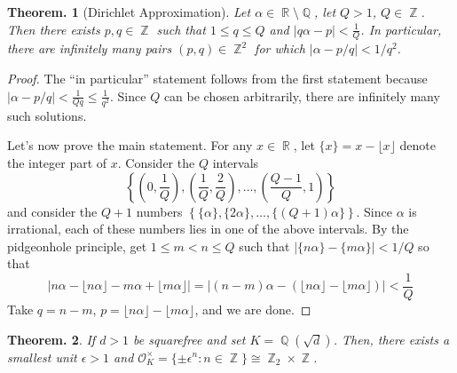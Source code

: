 \documentclass[11pt, a4paper]{memoir}
\DeclareMathOperator{\Q}{{\mathbb{Q}}}
\DeclareMathOperator{\Z}{{\mathbb{Z}}}
\DeclareMathOperator{\R}{{\mathbb{R}}}
\theoremstyle{change}
\newtheorem{theorem}{Theorem.}[section]
\theoremstyle{plain}
\theoremstyle{nonumberplain}
\newtheorem{proof}{Proof}
\numberwithin{equation}{section}
\begin{document}
\begin{theorem}[Dirichlet Approximation]
    Let $\alpha\in\R\setminus\Q$, let $Q>1$, $Q\in\Z$.
    Then there exists $p,q\in\Z$ such that $1\leq q\leq Q$ and $|q\alpha-p|<\frac{1}{Q}$.
    In particular, there are infinitely many pairs $(p,q)\in\Z^2$ for which $|\alpha-p/q|<1/q^2$.
\end{theorem}
\begin{proof}
    The ``in particular'' statement follows from the first statement because $|\alpha-p/q|<\frac{1}{Qq}\leq\frac{1}{q^2}$.
    Since $Q$ can be chosen arbitrarily, there are infinitely many such solutions.

    Let's now prove the main statement.
    For any $x\in\R$, let $\{x\}=x-\lfloor x\rfloor$ denote the integer part of $x$.
    Consider the $Q$ intervals
    \begin{equation*}
        \left\{\left(0,\frac{1}{Q}\right),\left(\frac{1}{Q},\frac{2}{Q}\right),\ldots,\left(\frac{Q-1}{Q},1\right)\right\}
    \end{equation*}
    and consider the $Q+1$ numbers $\left\{\{\alpha\},\{2\alpha\},\ldots,\{(Q+1)\alpha\}\right\}$.
    Since $\alpha$ is irrational, each of these numbers lies in one of the above intervals.
    By the pidgeonhole principle, get $1\leq m<n\leq Q$ such that $|\{n\alpha\}-\{m\alpha\}|<1/Q$ so that
    \begin{equation*}
        \left\lvert n\alpha-\lfloor n\alpha\rfloor-m\alpha+\lfloor m\alpha\rfloor\right\rvert=\left\lvert(n-m)\alpha-(\lfloor n\alpha\rfloor-\lfloor m\alpha\rfloor)\right\rvert<\frac{1}{Q}
    \end{equation*}
    Take $q=n-m$, $p=\lfloor n\alpha\rfloor-\lfloor m\alpha\rfloor$, and we are done.
\end{proof}
\begin{theorem}
    If $d>1$ be squarefree and set $K=\Q(\sqrt{d})$.
    Then, there exists a smallest unit $\epsilon>1$ and $\mathcal{O}_K^\times=\{\pm\epsilon^n:n\in\Z\}\cong \Z_2\times\Z$.
\end{theorem}
\end{document}
